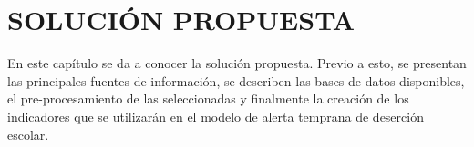 \chapter{SOLUCIÓN PROPUESTA}
\label{ch:solucionpropuesta}

En este capítulo se da a conocer la solución propuesta. Previo a esto, se presentan las principales fuentes de información, se describen las bases de datos disponibles, el pre-procesamiento de las seleccionadas y finalmente la creación de los indicadores que se utilizarán en el modelo de alerta temprana de deserción escolar.




